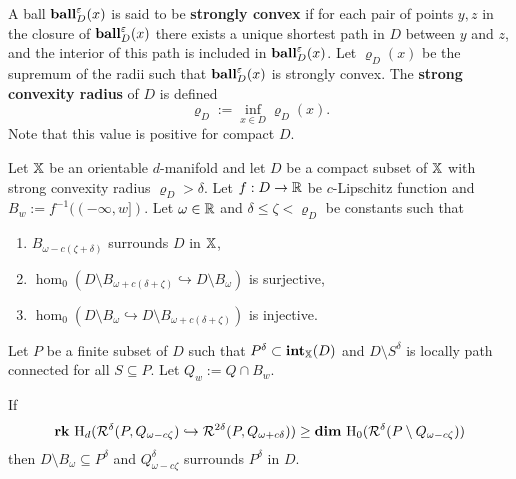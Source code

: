 A ball $\mathbf{ball}_D^\varepsilon(x)$ is said to be \textbf{strongly convex} if for each pair of points $y,z$ in the closure of $\mathbf{ball}_D^\varepsilon(x)$ there exists a unique shortest path in $D$ between $y$ and $z$, and the interior of this path is included in $\mathbf{ball}_D^\varepsilon(x)$.
Let $\varrho_D(x)$ be the supremum of the radii such that $\mathbf{ball}_D^\varepsilon(x)$ is strongly convex.
The \textbf{strong convexity radius} of $D$ is defined
\[ \varrho_D := \inf_{x\in D} \varrho_D(x).\]
Note that this value is positive for compact $D$.

\begin{theorem}\label{thm:algo_tcc}
  Let $\mathbb{X}$ be an orientable $d$-manifold and let $D$ be a compact subset of $\mathbb{X}$ with strong convexity radius $\varrho_D > \delta$.
  Let $f : D\to\mathbb{R}$ be $c$-Lipschitz function and $B_w := f^{-1}((-\infty,w])$.
  Let $\omega\in\mathbb{R}$ and $\delta\leq\zeta < \varrho_D$ be constants such that
  \begin{enumerate}
    \item $B_{\omega - c(\zeta +\delta)}$ surrounds $D$ in $\mathbb{X}$,
    \item $\hom_0(D\setminus B_{\omega+c(\delta+\zeta)}\hookrightarrow D\setminus B_\omega)$ is surjective,
    \item $\hom_0(D\setminus B_\omega\hookrightarrow D\setminus B_{\omega+c(\delta+\zeta)})$ is injective.
  \end{enumerate}

  Let $P$ be a finite subset of $D$ such that $P^\delta\subset \mathbf{int}_{\mathbb{X}}(D)$ and $D\setminus S^\delta$ is locally path connected for all $S\subseteq P$.
  Let $Q_w := Q\cap B_w$.

  If
  \[\mathbf{rk}~\mathrm{H}_d(\mathcal{R}^\delta(P, Q_{\omega -c\zeta})\hookrightarrow \mathcal{R}^{2\delta}(P, Q_{\omega+c\delta})) \geq \mathbf{dim}~\mathrm{H}_0(\mathcal{R}^\delta(P\setminus Q_{\omega-c\zeta}))\]
  then $D\setminus B_\omega\subseteq P^\delta$ and $Q_{\omega-c\zeta}^\delta$ surrounds $P^\delta$ in $D$.
\end{theorem}
